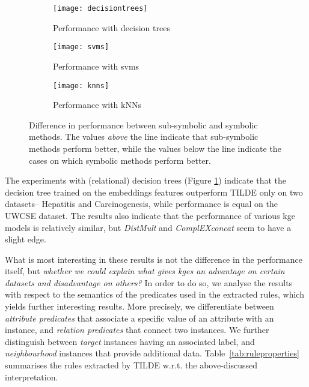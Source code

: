 

\begin{figure}[!ht]
	\centering
	\begin{subfigure}{0.98\linewidth}
		\centering
		\texttt{[image: decisiontrees]}
		\caption{Performance with decision trees\label{fig:dtres}}
	\end{subfigure}

	\begin{subfigure}{0.98\linewidth}
		\centering
		\texttt{[image: svms]}

		\caption{Performance with svms\label{fig:svms}}
	\end{subfigure}

	\begin{subfigure}{0.98\linewidth}
		\centering
		\texttt{[image: knns]}

		\caption{Performance with kNNs\label{fig:knns}}
	\end{subfigure}

	\caption[Difference in performance between sub-symbolic and symbolic methods.]{Difference in performance between sub-symbolic and symbolic methods. The values \textit{above} the line indicate that sub-symbolic methods perform better, while the values below the line indicate the cases on which symbolic methods perform better.}
\end{figure}








The experiments with (relational) decision trees (Figure \ref{fig:dtres}) indicate that the decision tree trained on the embeddings features outperform TILDE only on two datasets-- Hepatitis and Carcinogenesis, while performance is equal on the UWCSE dataset.
The results also indicate that the performance of various \gls{kge} models is relatively similar, but \textit{DistMult} and \textit{ComplEXconcat} seem to have a slight edge.



What is most interesting in these results is not the difference in the performance itself, but \textit{whether we could explain what gives \gls{kge}s  an advantage on certain datasets and disadvantage on others?}
In order to do so, we analyse the results with respect to the semantics of the predicates used in the extracted rules, which yields further interesting results.
More precisely, we differentiate between \textit{attribute predicates} that associate a specific value of an attribute with an instance, and \textit{relation predicates} that connect two instances.
We further distinguish between \textit{target} instances having an associated label, and \textit{neighbourhood} instances that provide additional data.
Table~\ref{tab:ruleproperties} summarises the rules extracted by TILDE w.r.t. the above-discussed interpretation.



